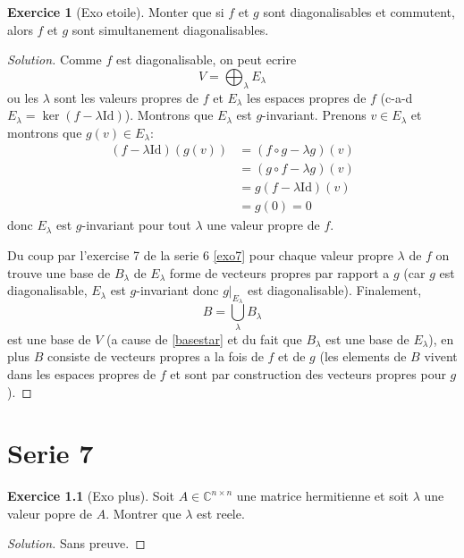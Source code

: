\documentclass[a4paper,12pt,french]{report}
\theoremstyle{plain}
\theoremstyle{definition}
\newtheorem{exercise}{Exercice}[chapter]
\begin{document}
\begin{exercise}[Exo etoile]
Monter que si $f$ et $g$ sont diagonalisables et commutent, alors $f$ et $g$ sont simultanement diagonalisables.
\end{exercise}
\begin{proof}[Solution]
Comme $f$ est diagonalisable, on peut ecrire
\begin{equation}
V=\bigoplus_{\lambda} E_{\lambda} \label{basestar}
\end{equation}
ou les $\lambda$ sont les valeurs propres de $f$ et $E_{\lambda}$ les espaces propres de $f$ (c-a-d $E_{\lambda}=\ker(f-\lambda \mathrm{Id})$). Montrons que $E_{\lambda}$ est $g$-invariant. Prenons $v\in E_{\lambda}$ et montrons que $g(v)\in E_{\lambda}$:
\begin{align*}
(f-\lambda \mathrm{Id})(g(v)) & =(f\circ g-\lambda g )(v) \\
 & =(g\circ f- \lambda g)(v) \\
 & =g(f-\lambda \mathrm{Id} )(v) \\
 & =g(0)=0
\end{align*}
donc $E_{\lambda}$ est $g$-invariant pour tout $\lambda$ une valeur propre de $f$.

Du coup par l'exercise 7 de la serie 6 \ref{exo7} pour chaque valeur propre $\lambda$ de $f$ on trouve une base de $B_{\lambda}$ de $E_{\lambda}$ forme de vecteurs propres par rapport a $g$ (car $g$ est diagonalisable, $E_{\lambda}$ est $g$-invariant donc $g|_{E_{\lambda}}$ est diagonalisable). Finalement, 
$$
B=\bigcup _{\lambda}B_{\lambda}
$$
est une base de $V$ (a cause de \ref{basestar} et du fait que $B_{\lambda}$ est une base de $E_{\lambda}$), en plus $B$ consiste de vecteurs propres a la fois de $f$ et de $g$ (les elements de $B$ vivent dans les espaces propres de $f$ et sont par construction des vecteurs propres pour $g$). 
\end{proof}
\chapter{Serie 7}
\begin{exercise}[Exo plus]
Soit $A\in \mathbb{C}^{n\times n}$ une matrice hermitienne et soit $\lambda$ une valeur popre de $A$. Montrer que $\lambda$ est reele.
\end{exercise}
\begin{proof}[Solution]
Sans preuve.
\end{proof}
\end{document}
